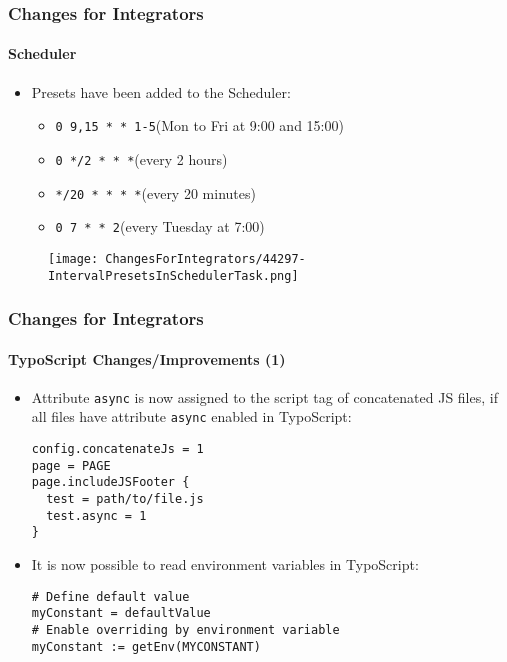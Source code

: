 
\begin{frame}[fragile]
	\frametitle{Changes for Integrators}
	\framesubtitle{Scheduler}

	\begin{itemize}
		\item Presets have been added to the Scheduler:

			\begin{itemize}
				\item \texttt{0 9,15 * * 1-5}\tabto{3.8cm}(Mon to Fri at 9:00 and 15:00)
				\item \texttt{0 */2 * * *}\tabto{3.8cm}(every 2 hours)
				\item \texttt{*/20 * * * *}\tabto{3.8cm}(every 20 minutes)
				\item \texttt{0 7 * * 2}\tabto{3.8cm}(every Tuesday at 7:00)
			\end{itemize}

	\end{itemize}

	\begin{figure}
		\texttt{[image: ChangesForIntegrators/44297-IntervalPresetsInSchedulerTask.png]}
	\end{figure}

\end{frame}


\begin{frame}[fragile]
	\frametitle{Changes for Integrators}
	\framesubtitle{TypoScript Changes/Improvements (1)}

	\lstset{basicstyle=\smaller\ttfamily}

	\begin{itemize}
		\item Attribute \texttt{async} is now assigned to the script tag of
			concatenated JS files, if all files have attribute \texttt{async}
			enabled in TypoScript:

			\begin{lstlisting}
config.concatenateJs = 1
page = PAGE
page.includeJSFooter {
  test = path/to/file.js
  test.async = 1
}
			\end{lstlisting}

		\item It is now possible to read environment variables in TypoScript:

			\begin{lstlisting}
# Define default value
myConstant = defaultValue
# Enable overriding by environment variable
myConstant := getEnv(MYCONSTANT)
			\end{lstlisting}

	\end{itemize}

\end{frame}

